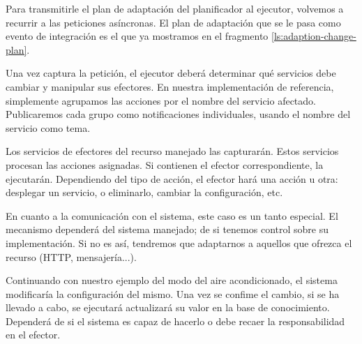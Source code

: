 Para transmitirle el plan de adaptación del planificador al ejecutor, volvemos a recurrir a las peticiones asíncronas. El plan de adaptación que se le pasa como evento de integración es el que ya mostramos en el fragmento \ref{ls:adaption-change-plan}.

Una vez captura la petición, el ejecutor deberá determinar qué servicios debe cambiar y manipular sus efectores. En nuestra implementación de referencia, simplemente agrupamos las acciones por el nombre del servicio afectado. Publicaremos cada grupo como notificaciones individuales, usando el nombre del servicio como tema.

Los servicios de efectores del recurso manejado las capturarán. Estos servicios procesan las acciones asignadas. Si contienen el efector correspondiente, la ejecutarán. Dependiendo del tipo de acción, el efector hará una acción u otra: desplegar un servicio, o eliminarlo, cambiar la configuración, etc.

En cuanto a la comunicación con el sistema, este caso es un tanto especial. El mecanismo dependerá del sistema manejado; de si tenemos control sobre su implementación. Si no es así, tendremos que adaptarnos a aquellos que ofrezca el recurso (HTTP, mensajería...).

Continuando con nuestro ejemplo del modo del aire acondicionado, el sistema modificaría la configuración del mismo. Una vez se confime el cambio, si se ha llevado a cabo, se ejecutará actualizará su valor en la base de conocimiento. Dependerá de si el sistema es capaz de hacerlo o debe recaer la responsabilidad en el efector.
